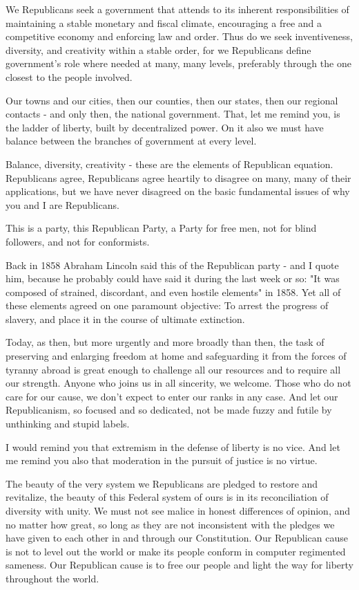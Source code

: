 \documentclass{article}
\begin{document}
We Republicans seek a government that attends to its inherent responsibilities
of maintaining a stable monetary and fiscal climate, encouraging a free and a
competitive economy and enforcing law and order. Thus do we seek inventiveness,
diversity, and creativity within a stable order, for we Republicans define
government's role where needed at many, many levels, preferably through the one
closest to the people involved.

Our towns and our cities, then our counties, then our states, then our regional
contacts - and only then, the national government. That, let me remind you, is
the ladder of liberty, built by decentralized power. On it also we must have
balance between the branches of government at every level.

Balance, diversity, creativity - these are the elements of Republican equation.
Republicans agree, Republicans agree heartily to disagree on many, many of
their applications, but we have never disagreed on the basic fundamental issues
of why you and I are Republicans.

This is a party, this Republican Party, a Party for free men, not for blind
followers, and not for conformists.

Back in 1858 Abraham Lincoln said this of the Republican party - and I quote
him, because he probably could have said it during the last week or so: "It was
composed of strained, discordant, and even hostile elements" in 1858. Yet all
of these elements agreed on one paramount objective: To arrest the progress of
slavery, and place it in the course of ultimate extinction.

Today, as then, but more urgently and more broadly than then, the task of
preserving and enlarging freedom at home and safeguarding it from the forces of
tyranny abroad is great enough to challenge all our resources and to require
all our strength. Anyone who joins us in all sincerity, we welcome. Those who
do not care for our cause, we don't expect to enter our ranks in any case. And
let our Republicanism, so focused and so dedicated, not be made fuzzy and
futile by unthinking and stupid labels.

I would remind you that extremism in the defense of liberty is no vice. And let
me remind you also that moderation in the pursuit of justice is no virtue.

The beauty of the very system we Republicans are pledged to restore and
revitalize, the beauty of this Federal system of ours is in its reconciliation
of diversity with unity. We must not see malice in honest differences of
opinion, and no matter how great, so long as they are not inconsistent with the
pledges we have given to each other in and through our Constitution. Our
Republican cause is not to level out the world or make its people conform in
computer regimented sameness. Our Republican cause is to free our people and
light the way for liberty throughout the world.
\end{document}
